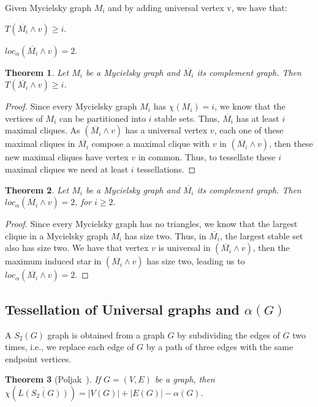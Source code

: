 \documentclass[9pt]{entcs} \usepackage{entcsmacro}
\newtheorem{teo}{Theorem}[section]
\begin{document}
Given Mycielsky graph $M_i$ and by adding universal vertex v, we have that:

$T(\overline{M_i}\land v) \geq i$.

$loc_\alpha(\overline{M_i}\land v) = 2$.

\begin{teo}\label{teo:MycTess}
Let $M_i$ be a Mycielsky graph and $\overline{M_i}$ its complement graph. Then $T(\overline{M_i}\land v) \geq i$.
\end{teo}
\begin{proof}
Since every Mycielsky graph $M_i$ has $\chi(M_i) = i$, we know that the vertices of $M_i$ can be partitioned into $i$ stable sets. Thus, $\overline{M_i}$ has at least $i$ maximal cliques. As $(\overline{M_i}\land v)$ has a universal vertex $v$, each one of these maximal cliques in $\overline{M_i}$ compose a maximal clique with $v$ in $(\overline{M_i}\land v)$, then these new maximal cliques have vertex $v$ in common. Thus, to tessellate these $i$ maximal cliques we need at least $i$ tessellations.
\end{proof}

\begin{teo}\label{teo:MycLocA}
Let $M_i$ be a Mycielsky graph and $\overline{M_i}$ its complement graph. Then $loc_\alpha(\overline{M_i}\land v) = 2$, for $i\geq 2$.
\end{teo}
\begin{proof}
Since every Mycielsky graph has no triangles, we know that the largest clique in a Mycielsky graph $M_i$ has size two. Thus, in
$\overline{M_i}$, the largest stable set also has size two. We have that vertex $v$ is universal in $(\overline{M_i}\land v)$, then the maximum induced star in $(\overline{M_i}\land v)$ has size two, leading us to 
$loc_\alpha(\overline{M_i}\land v) = 2$.  
\end{proof}

\subsection{Tessellation of Universal graphs and $\alpha(G)$}
\label{sub:23}

A $S_2(G)$ graph is obtained from a graph $G$ by subdividing the edges of $G$ two times, i.e., we replace each edge of $G$ by a path of three edges with the same endpoint vertices.

\begin{teo}
[Poljak~\cite{ArPoljak}] 
If $G=(V, E)$ be a graph, then $\chi(\overline{L(S_2(G))}) = |V(G)| + |E(G)| - \alpha(G)$.
\label{teo:23aa}
\end{teo}
\end{document}
